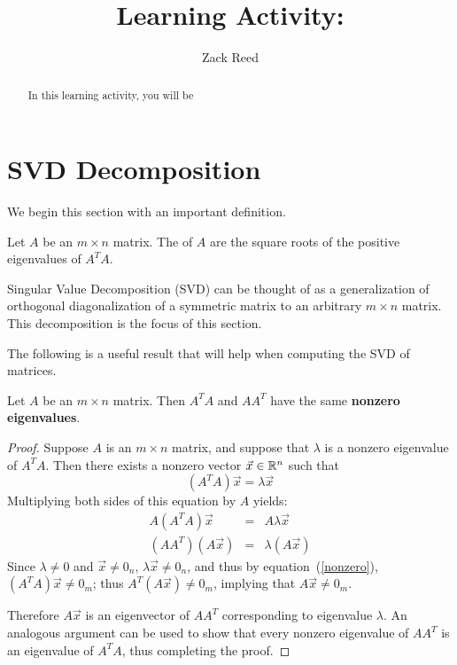 \documentclass{ximera}
\author{Zack Reed}
\title{Learning Activity: }
\begin{document}
\begin{abstract}

    In this learning activity, you will be 
\end{abstract}
\maketitle

\section*{SVD Decomposition}
We begin this section with an important definition.
 
\begin{definition}\label{singularvalues}
Let $A$ be an $m\times n$ matrix. The  of $A$ are the square roots of the positive
eigenvalues of $A^TA.$
\end{definition}
 
Singular Value Decomposition (SVD) can be thought of as
a generalization of orthogonal diagonalization of a symmetric matrix
to an arbitrary $m\times n$ matrix. This decomposition is the focus of this section.
 
The following is a useful result that will help when computing the SVD of matrices.
 
\begin{lemma}\label{lem:samenonzeroeigenvalues}
Let $A$ be an $m \times n$ matrix. Then $A^TA$ and $AA^T$ have the same \textbf{nonzero eigenvalues}.
\end{lemma}
 
\begin{proof}
Suppose $A$ is an $m\times n$ matrix, and suppose that  $\lambda$ is a nonzero eigenvalue of $A^TA$.
Then there exists a nonzero vector $\vec{x} \in \mathbb{R}^n$ such that
\begin{equation}\label{nonzero}
(A^TA)\vec{x}=\lambda \vec{x}
\end{equation}
Multiplying both sides of this equation by $A$ yields:
\begin{eqnarray*}
A(A^TA)\vec{x} & = & A\lambda \vec{x}\\
(AA^T)(A\vec{x}) & = & \lambda (A\vec{x})
\end{eqnarray*}
Since $\lambda\neq 0$ and $\vec{x}\neq 0_n$, $\lambda \vec{x}\neq 0_n$,
and thus by equation~(\ref{nonzero}),
$(A^TA)\vec{x}\neq 0_m$; thus $A^T(A\vec{x})\neq 0_m$,
implying that $A\vec{x}\neq 0_m$.
 
Therefore $A\vec{x}$ is an eigenvector of $AA^T$ corresponding to eigenvalue
$\lambda$.  An analogous argument can be used to show that every
nonzero eigenvalue of $AA^T$ is an eigenvalue of $A^TA$, thus
completing the proof.
\end{proof}
 
\end{document}

